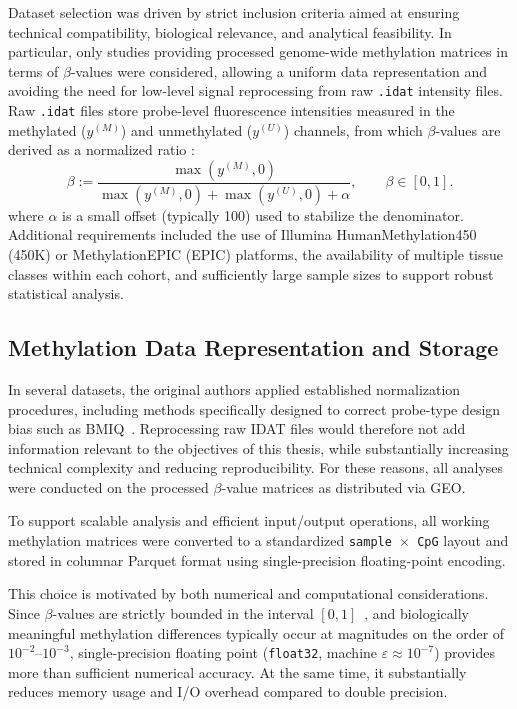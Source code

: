 Dataset selection was driven by strict inclusion criteria aimed at ensuring technical compatibility, biological relevance, and analytical feasibility. In particular, only studies providing processed genome-wide methylation matrices in terms of $\beta$-values were considered, allowing a uniform data representation and avoiding the need for low-level signal reprocessing from raw \texttt{.idat}  intensity files. Raw \texttt{.idat} files store probe-level fluorescence intensities measured in the methylated ($y^{(M)}$) and unmethylated ($y^{(U)}$) channels, from which $\beta$-values are derived as a normalized ratio \cite{Du2010}:
\begin{equation}
\beta := \frac{\max(y^{(M)},0)}{\max(y^{(M)},0)+\max(y^{(U)},0)+\alpha},
\qquad \beta\in[0,1].
\label{eq:beta_definition}
\end{equation}
where $\alpha$ is a small offset (typically 100) used to stabilize the denominator. Additional requirements included the use of Illumina HumanMethylation450 (450K) or MethylationEPIC (EPIC) platforms, the availability of multiple tissue classes within each cohort, and sufficiently large sample sizes to support robust statistical analysis.

\subsection{Methylation Data Representation and Storage}

In several datasets, the original authors applied established normalization procedures, including methods specifically designed to correct probe-type design bias such as BMIQ~\cite{Teschendorff2013BMIQ}. Reprocessing raw IDAT files would therefore not add information relevant to the objectives of this thesis, while substantially increasing technical complexity and reducing reproducibility. For these reasons, all analyses were conducted on the processed $\beta$-value matrices as distributed via GEO.

To support scalable analysis and efficient input/output operations, all working methylation matrices were converted to a standardized \texttt{sample~$\times$~CpG} layout and stored in columnar Parquet format using single-precision floating-point encoding.

This choice is motivated by both numerical and computational considerations. Since $\beta$-values are strictly bounded in the interval $[0,1]$~\cite{Du2010}, and biologically meaningful methylation differences typically occur at magnitudes on the order of $10^{-2}$–$10^{-3}$, single-precision floating point (\texttt{float32}, machine $\varepsilon \approx 10^{-7}$) provides more than sufficient numerical accuracy. At the same time, it substantially reduces memory usage and I/O overhead compared to double precision.

